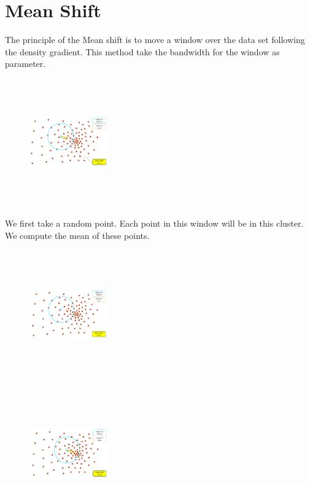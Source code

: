 \section{Mean Shift}

The principle of the Mean shift is to move a window over the data set following the density gradient. This method take the bandwidth for the window as parameter.\\
\begin{figure}[h!]
\includegraphics[width=0.3\textwidth, height=5.5cm]{Image/algo-meanshift1.png}
\end{figure}

We first take a random point. Each point in this window will be in this cluster. We compute the mean of these points.




\begin{figure}[h!]
\includegraphics[width=0.3\textwidth, height=5.5cm]{Image/algo-meanshift2.png}
\end{figure}



\begin{figure}[h!]
\includegraphics[width=0.3\textwidth, height=5.5cm]{Image/algo-meanshift3.png}
\end{figure}


